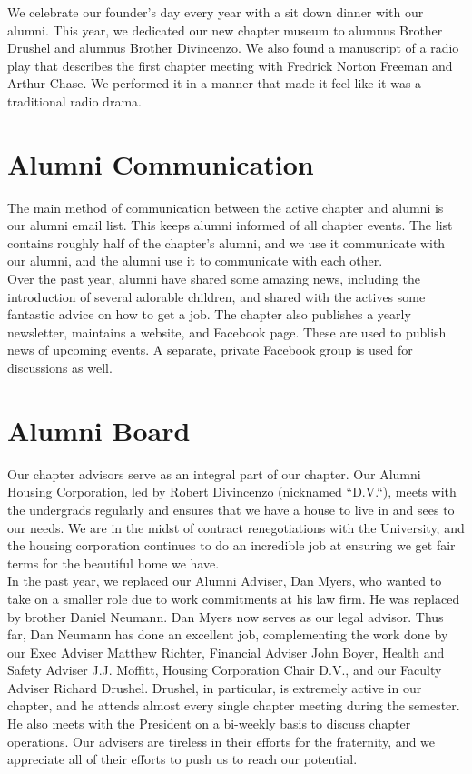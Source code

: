     We celebrate our founder’s day every year with a sit down dinner with our alumni. This year, we dedicated our new chapter museum to alumnus Brother Drushel and alumnus Brother Divincenzo. We also found a manuscript of a radio play that describes the first chapter meeting with Fredrick Norton Freeman and Arthur Chase. We performed it in a manner that made it feel like it was a traditional radio drama.
    
  \section*{Alumni Communication}
    The main method of communication between the active chapter and alumni is our alumni email list. This keeps alumni informed of all chapter events. The list contains roughly half of the chapter’s alumni, and we use it communicate with our alumni, and the alumni use it to communicate with each other. \\

    Over the past year, alumni have shared some amazing news, including the introduction of several adorable children, and shared with the actives some fantastic advice on how to get a job. The chapter also publishes a yearly newsletter, maintains a website, and Facebook page. These are used to publish news of upcoming events. A separate, private Facebook group is used for discussions as well.
    
  \section*{Alumni Board}
    Our chapter advisors serve as an integral part of our chapter. Our Alumni Housing Corporation, led by Robert Divincenzo (nicknamed ``D.V.``), meets with the undergrads regularly and ensures that we have a house to live in and sees to our needs. We are in the midst of contract renegotiations with the University, and the housing corporation continues to do an incredible job at ensuring we get fair terms for the beautiful home we have. \\

    In the past year, we replaced our Alumni Adviser, Dan Myers, who wanted to take on a smaller role due to work commitments at his law firm. He was replaced by brother Daniel Neumann. Dan Myers now serves as our legal advisor. Thus far, Dan Neumann has done an excellent job, complementing the work done by our Exec Adviser Matthew Richter, Financial Adviser John Boyer, Health and Safety Adviser J.J. Moffitt, Housing Corporation Chair D.V., and our Faculty Adviser Richard Drushel. Drushel, in particular, is extremely active in our chapter, and he attends almost every single chapter meeting during the semester. He also meets with the President on a bi-weekly basis to discuss chapter operations. Our advisers are tireless in their efforts for the fraternity, and we appreciate all of their efforts to push us to reach our potential.
    
